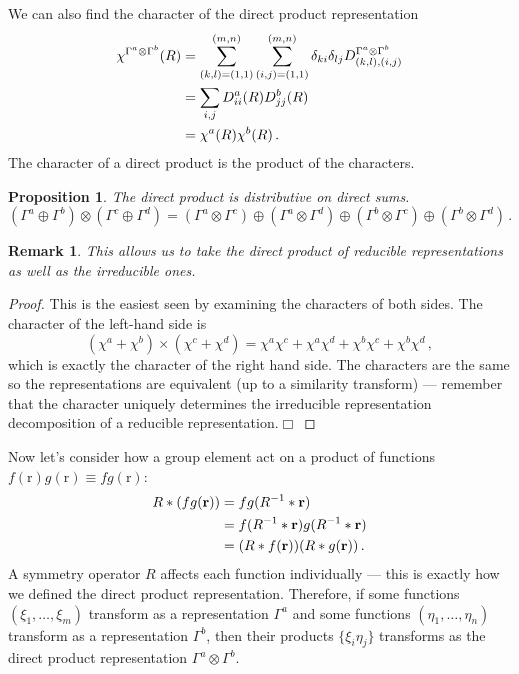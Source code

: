 \documentclass{article}
\theoremstyle{plain}\theoremheaderfont{\normalfont\itshape}\theorembodyfont{\rmfamily}\theoremseparator{.}\newtheorem*{rem}{Remark}\newtheorem*{ex}{Example}\newtheorem*{proof}{Proof}\newtheorem*{altp}{Alternative proof}
\theoremstyle{plain}\theoremheaderfont{\normalfont\bfseries}\theorembodyfont{\rmfamily}\theoremseparator{.}\newtheorem{thm}{Theorem}[section]\newtheorem{lem}[thm]{Lemma}\newtheorem{prop}[thm]{Proposition}\newtheorem*{cor}{Corollary}\newtheorem{defn}[thm]{Definition}\newtheorem{clm}[thm]{Claim}\newtheorem{clminproof}{Claim}\newtheorem*{law}{Law}\newtheorem{pos}[thm]{Postulate}
\theoremstyle{break}\theoremheaderfont{\normalfont\itshape}\theorembodyfont{\rmfamily}\theoremseparator{.\medskip}\newtheorem*{proofskip}{Proof}\newtheorem*{exs}{Examples}\newtheorem*{rems}{Remarks}
\theoremstyle{break}\theoremheaderfont{\normalfont\bfseries}\theorembodyfont{\rmfamily}\theoremseparator{.\medskip}\newtheorem{lemskip}[thm]{Lemma}\newtheorem{defnskip}[thm]{Definition}\newtheorem{propskip}[thm]{Proposition}\newtheorem{thmskip}[thm]{Theorem}
\numberwithin{equation}{section}
\newcommand{\qed}{\hfill\ensuremath{\Box}}
\newcommand{\vb}[1]{\bm{\mathrm{#1}}}
\begin{document}
    We can also find the character of the direct product representation
    \begin{align}
        \chi^{\Gamma^{a}\otimes\Gamma^{b}}(R)&=\sum_{(k,l)=(1,1)}^{(m,n)}\sum_{(i,j)=(1,1)}^{(m,n)}\delta_{ki}\delta_{lj} D_{(k,l),(i,j)}^{\Gamma^{a}\otimes\Gamma^{b}}\notag\\
        &=\sum_{i,j} D_{ii}^{a}(R) D_{jj}^{b}(R)\notag\\
        &=\chi^{a}(R)\chi^{b}(R)\,.
    \end{align}
    The character of a direct product is the product of the characters.

    \begin{prop}
        The direct product is distributive on direct sums.
        \begin{equation}
            (\Gamma^a\oplus\Gamma^b)\otimes(\Gamma^c\oplus\Gamma^d)=(\Gamma^a\otimes\Gamma^c)\oplus(\Gamma^a\otimes\Gamma^d)\oplus(\Gamma^b\otimes\Gamma^c)\oplus(\Gamma^b\otimes\Gamma^d)\,.
        \end{equation}
    \end{prop}
    \begin{rem}
        This allows us to take the direct product of reducible representations as well as the irreducible ones.
    \end{rem}
    \begin{proof}
        This is the easiest seen by examining the characters of both sides. The character of the left-hand side is
        \begin{equation}
            (\chi^a+\chi^b)\times(\chi^c+\chi^d)=\chi^a\chi^c+\chi^a\chi^d+\chi^b\chi^c+\chi^b\chi^d\,,
        \end{equation}
        which is exactly the character of the right hand side. The characters are the same so the representations are equivalent (up to a similarity transform) --- remember that the character uniquely determines the irreducible representation decomposition of a reducible representation.\qed
    \end{proof}

    Now let's consider how a group element act on a product of functions \(f(\vb{r})g(\vb{r})\equiv fg(\vb{r})\):
    \begin{align}
        R*(fg(\vb{r}))&=fg(R^{-1}*\vb{r})\notag\\
        &=f(R^{-1}*\vb{r})g(R^{-1}*\vb{r})\notag\\
        &=(R*f(\vb{r}))(R*g(\vb{r}))\,.
    \end{align}
    A symmetry operator \(R\) affects each function individually --- this is exactly how we defined the direct product representation. Therefore, if some functions \((\xi_1,\dots,\xi_m)\) transform as a representation \(\Gamma^{a}\) and some functions \((\eta_1,\dots,\eta_n)\) transform as a representation \(\Gamma^{b}\), then their products \(\{\xi_i\eta_j\}\) transforms as the direct product representation \(\Gamma^{a}\otimes\Gamma^{b}\).
\end{document}
